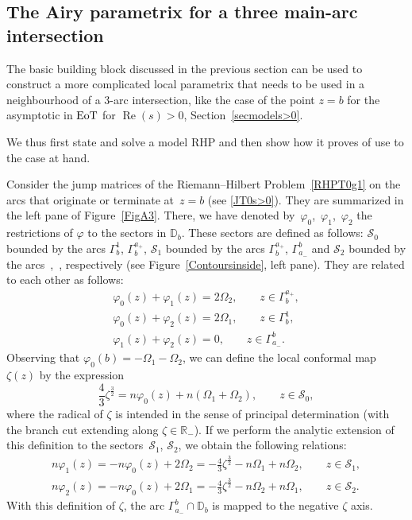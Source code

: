 \documentclass[10pt,a4paper]{amsart}
\numberwithin{equation}{section}
\theoremstyle{definition}
\def \scr{\mathscr}
\def \DD{\mathbb D}
\def\R{{\mathbb R}}
\def \Re{\operatorname{Re} }
\begin{document}
\subsection{The Airy parametrix for a three main-arc intersection}
\label{SecA3}
The basic building block discussed in the previous section can be used to construct a more complicated local parametrix that needs to be used in a neighbourhood of a $3$-arc intersection, like the case of the point $z=b$ for the asymptotic in ${\rm EoT}$ for $\Re(s)>0$, Section~\ref{secmodels>0}.


We thus first state and solve a model RHP and then show how it proves of use to the case at hand.

Consider the jump matrices of the Riemann--Hilbert Problem~\ref{RHPT0g1} on the arcs that originate or terminate at~${z=b}$ (see \eqref{JT0s>0}). They are summarized in the left pane of Figure~\ref{FigA3}. There, we have denoted by~$\varphi_0$,~$\varphi_1$,~$\varphi_2$ the restrictions of $\varphi$ to the sectors in $\DD_b$. These sectors are defined as follows: $\scr S_0$ bounded by the arcs $\Gamma_b^1$, $\Gamma_b^{a_+}$,
$\scr S_1$ bounded by the arcs $\Gamma_b^{a_+}$, $\Gamma_{a_-}^b$ and
$\scr S_2$ bounded by the arcs~,~, respectively (see Figure~\ref{Contoursinside}, left pane).
They are related to each other as follows:
\begin{gather*}
 \varphi_0(z) + \varphi_1(z) = 2\Omega_2, \qquad z\in \Gamma_{b}^{a_+},\\
 \varphi_0(z) + \varphi_2(z) = 2\Omega_1, \qquad z\in \Gamma_{b}^{1},\\
 \varphi_1(z) + \varphi_2(z) = 0, \qquad z\in \Gamma_{a_-}^{b}.
\end{gather*}
Observing that $\varphi_0(b) = -\Omega_1- \Omega_2 $, we can define the local conformal map $\zeta(z)$ by the expression
\[
\frac 43 \zeta^\frac 32 = n\varphi_0(z) + n(\Omega_1 + \Omega_2), \qquad z\in \scr S_0,
\]
where the radical of $\zeta$ is intended in the sense of principal determination (with the branch cut extending along $\zeta\in \R_-$).
If we perform the analytic extension of this definition to the sectors~$\scr S_1$, $\scr S_2$, we obtain the following relations:
\begin{gather*}
n\varphi_1(z) = -n\varphi_0(z) + 2\Omega_2 =- \frac 43 \zeta^\frac 32 - n\Omega_1 + n\Omega_2,\qquad z\in \scr S_1,\\
n\varphi_2(z) = -n\varphi_0(z) + 2\Omega_1 =- \frac 43 \zeta^\frac 32 - n\Omega_2 + n\Omega_1,\qquad z\in \scr S_2.
\end{gather*}
With this definition of $\zeta$, the arc $\Gamma_{a_-}^b\cap \DD_b$ is mapped to the negative $\zeta$ axis.
\end{document}

